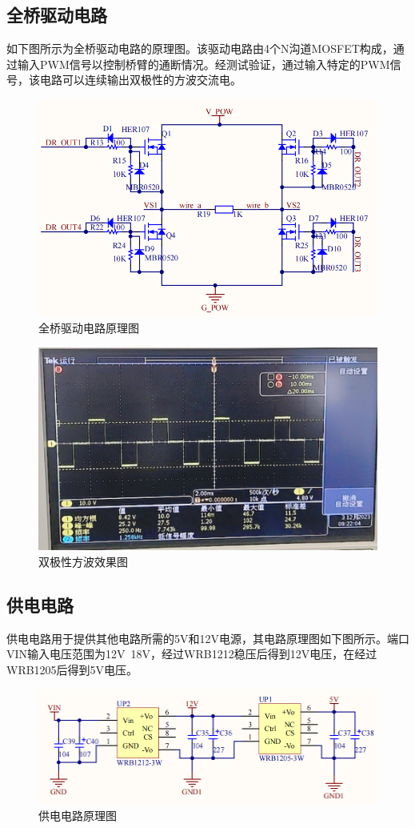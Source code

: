\documentclass[UTF8]{article}
\begin{document}
\subsection{全桥驱动电路}
如下图所示为全桥驱动电路的原理图。该驱动电路由4个N沟道MOSFET构成，通过输入PWM信号以控制桥臂的通断情况。经测试验证，通过输入特定的PWM信号，该电路可以连续输出双极性的方波交流电。
\begin{figure}[H]
    \centering %
    \includegraphics[width=.8\textwidth]{figure/全桥驱动电路.png} 
    \caption{全桥驱动电路原理图} %
\end{figure}
\begin{figure}[H]
    \centering %
    \includegraphics[width=.6\textwidth]{figure/双极性方波.png} 
    \caption{双极性方波效果图} %
\end{figure}

\subsection{供电电路}
供电电路用于提供其他电路所需的5V和12V电源，其电路原理图如下图所示。端口VIN输入电压范围为12V~18V，经过WRB1212稳压后得到12V电压，在经过WRB1205后得到5V电压。
\begin{figure}[H]
    \centering %
    \includegraphics[width=.8\textwidth]{figure/电源电路.png} 
    \caption{供电电路原理图} %
\end{figure}
\end{document}
